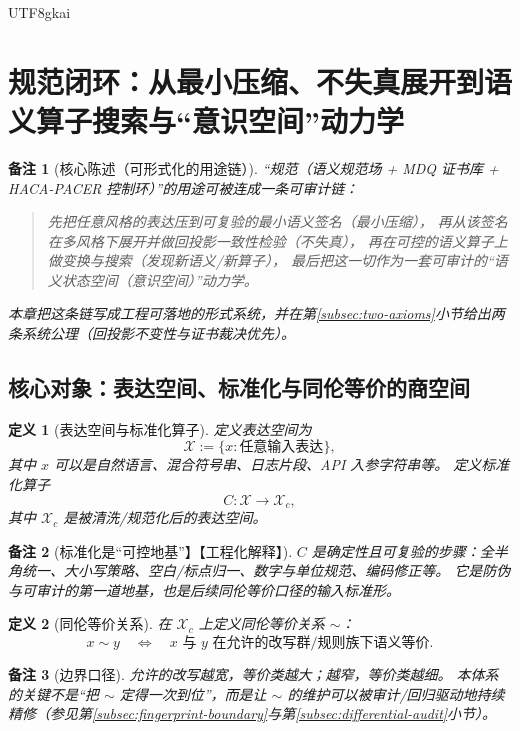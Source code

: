\documentclass[12pt]{article}
\newtheorem{definition}{定义}[section]
\newtheorem{remark}{备注}[section]
\begin{document}
\begin{CJK*}{UTF8}{gkai}
\clearpage

\section{规范闭环：从最小压缩、不失真展开到语义算子搜索与“意识空间”动力学}
\label{sec:normative-loop-consciousness-dynamics}

\begin{remark}[核心陈述（可形式化的用途链）]
“规范（语义规范场 + MDQ 证书库 + HACA-PACER 控制环）”的用途可被连成一条可审计链：
\begin{quote}
先把任意风格的表达压到可复验的最小语义签名（最小压缩），
再从该签名在多风格下展开并做回投影一致性检验（不失真），
再在可控的语义算子上做变换与搜索（发现新语义/新算子），
最后把这一切作为一套可审计的“语义状态空间（意识空间）”动力学。
\end{quote}
本章把这条链写成工程可落地的形式系统，并在第\ref{subsec:two-axioms}小节给出两条系统公理（回投影不变性与证书裁决优先）。
\end{remark}

\subsection{核心对象：表达空间、标准化与同伦等价的商空间}
\label{subsec:core-objects-quotient}

\begin{definition}[表达空间与标准化算子]
定义表达空间为
\[
\mathcal{X}:=\{x:\text{任意输入表达}\},
\]
其中 $x$ 可以是自然语言、混合符号串、日志片段、API 入参字符串等。
定义标准化算子
\[
C:\mathcal{X}\to \mathcal{X}_c,
\]
其中 $\mathcal{X}_c$ 是被清洗/规范化后的表达空间。
\end{definition}

\begin{remark}[标准化是“可控地基”】【工程化解释】]
$C$ 是确定性且可复验的步骤：全半角统一、大小写策略、空白/标点归一、数字与单位规范、编码修正等。
它是防伪与可审计的第一道地基，也是后续同伦等价口径的输入标准形。
\end{remark}

\begin{definition}[同伦等价关系]
在 $\mathcal{X}_c$ 上定义同伦等价关系 $\sim$：
\[
x\sim y\quad \Longleftrightarrow\quad
\text{$x$ 与 $y$ 在允许的改写群/规则族下语义等价}.
\]
\end{definition}

\begin{remark}[边界口径]
允许的改写越宽，等价类越大；越窄，等价类越细。
本体系的关键不是“把 $\sim$ 定得一次到位”，而是让 $\sim$ 的维护可以被审计/回归驱动地持续精修（参见第\ref{subsec:fingerprint-boundary}与第\ref{subsec:differential-audit}小节）。
\end{remark}


\end{CJK*}
\end{document}
